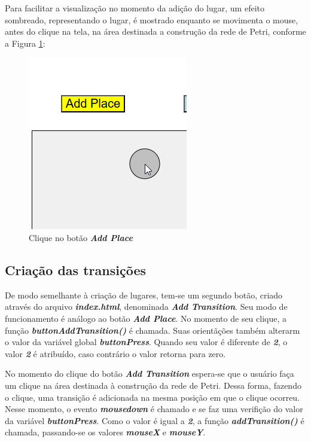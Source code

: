 \documentclass[
	12pt,				%
	openright,			%
	oneside,			%
	a4paper,			%
	english,			%
	brazil				%
	]{abntex2}
\theoremstyle{doispontos}
\begin{document}
Para facilitar a visualização no momento da adição do lugar, um efeito sombreado, representando o lugar, é mostrado enquanto se movimenta o mouse, antes do clique na tela, na área destinada a construção da rede de Petri, conforme a Figura \ref{fig:clique_add_place}:

\begin{figure}[ht] 
	\centering
	\includegraphics[scale=0.55]{figuras/exemplo_clique_addPlace.png}
	\caption[Clicando bo botao Add Place]{Clique no botão \textit{\textbf{Add Place}}}
	\label{fig:clique_add_place}
\end{figure}

\subsection{Criação das transições}

De modo semelhante à criação de lugares, tem-se um segundo botão, criado através do arquivo \textbf{\textit{index.html}}, denominada \textbf{\textit{Add Transition}}. Seu modo de funcionamento é análogo ao botão \textbf{\textit{Add Place}}. No momento de seu clique, a função \textbf{\textit{buttonAddTransition()}} é chamada. Suas orientãções também alterarm o valor da variável global \textbf{\textit{buttonPress}}. Quando seu valor é diferente de \textbf{\textit{2}}, o valor \textbf{\textit{2}} é atribuído, caso contrário o valor retorna para zero. 



No momento do clique do botão \textbf{\textit{Add Transition}} espera-se que o usuário faça um clique na área destinada à construção da rede de Petri. Dessa forma, fazendo o clique, uma transição é adicionada na mesma posição em que o clique ocorreu. Nesse momento, o evento \textbf{\textit{mousedown}} é chamado e se faz uma verifição do valor da variável \textbf{\textit{buttonPress}}. Como o valor é igual a \textbf{\textit{2}}, a função \textit{\textbf{addTransition()}} é chamada, passando-se os valores \textbf{\textit{mouseX}} e \textbf{\textit{mouseY}}.
\end{document}
